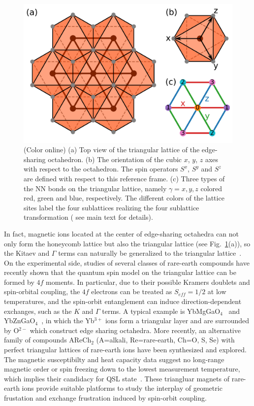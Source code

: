 \documentclass[aps,prb,reprint,amsfonts,amsmath,amssymb,showpacs,groupedaddress,superscriptaddress]{revtex4-1}
\begin{document}
\begin{figure}
    \centering
    \includegraphics[width=\columnwidth]{fig/ModelDefinition.pdf}
    \caption{\label{fig:ModelDefinition}(Color online) (a) Top view of the triangular lattice of the edge-sharing octahedron. (b) The orientation of the cubic $x$, $y$, $z$ axes with respect to the octahedron. The spin operators $S^x$, $S^y$ and $S^z$ are defined with respect to this reference frame. (c) Three types of the NN bonds on the triangular lattice, namely $\gamma=x, y, z$ colored red, green and blue, respectively. The different colors of the lattice sites label the four sublattices realizing the four sublattice transformation ( see main text for details).}
\end{figure}
In fact, magnetic ions located at the center of edge-sharing octahedra can not only form the honeycomb lattice but also the triangular lattice (see Fig.~\ref{fig:ModelDefinition}(a)), so the Kitaev and $\Gamma$ terms can naturally be generalized to the triangular lattice~\cite{PhysRevB.89.014414,PhysRevB.93.104417}. On the experimental side, studies of several classes of rare-earth compounds have recently shown that the quantum spin model on the triangular lattice can be formed by $4f$ moments. In particular, due to their possible Kramers doublets and spin-orbital coupling, the $4f$ electrons can be treated as $S_{eff}=1/2$ at low temperatures, and the spin-orbit entanglement can induce direction-dependent exchanges, such as the $K$ and $\Gamma$ terms. A typical example is YbMgGaO$_{4}$~\cite{srep16419,PhysRevLett.115.167203} and YbZnGaO$_{4}$~\cite{PhysRevLett.120.087201}, in which the Yb$^{3+}$ ions form a triangular layer and are surrounded by O$^{2-}$ which construct edge sharing octahedra. More recently, an alternative family of compounds AReCh$_2$ (A=alkali, Re=rare-earth, Ch=O, S, Se) with perfect triangular lattices of rare-earth ions have been synthesized and explored. The magnetic susceptibilty and heat capacity data suggest no long-range magnetic order or spin freezing down to the lowest measurement temperature, which implies their candidacy for QSL state~\cite{acsmaterialslett.9b00464,PhysRevMaterials.3.114413,PhysRevB.100.241116,Liu_2018,PhysRevB.99.180401,PhysRevB.100.224417,PhysRevB.100.144432}. These triangluar magnets of rare-earth ions provide suitable platforms to study the interplay of geometric frustation and exchange frustration induced by spin-orbit coupling.
\end{document}
